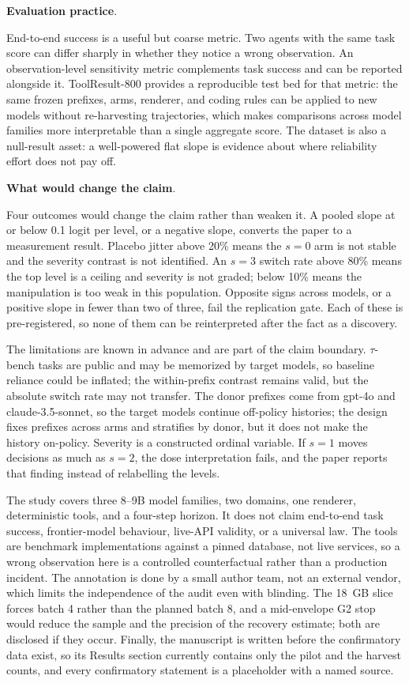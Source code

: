 \documentclass[a4paper,fleqn]{cas-sc}
\begin{document}
\noindent\textbf{Evaluation practice}.\

End-to-end success is a useful but coarse metric. Two agents with the same task score can differ
sharply in whether they notice a wrong observation. An observation-level sensitivity metric
complements task success and can be reported alongside it. ToolResult-800 provides a reproducible
test bed for that metric: the same frozen prefixes, arms, renderer, and coding rules can be
applied to new models without re-harvesting trajectories, which makes comparisons across model
families more interpretable than a single aggregate score. The dataset is also a null-result
asset: a well-powered flat slope is evidence about where reliability effort does not pay off.

\noindent\textbf{What would change the claim}.\

Four outcomes would change the claim rather than weaken it. A pooled slope at or below 0.1 logit
per level, or a negative slope, converts the paper to a measurement result. Placebo jitter above
20\% means the $s=0$ arm is not stable and the severity contrast is not identified. An $s=3$
switch rate above 80\% means the top level is a ceiling and severity is not graded; below 10\%
means the manipulation is too weak in this population. Opposite signs across models, or a
positive slope in fewer than two of three, fail the replication gate. Each of these is
pre-registered, so none of them can be reinterpreted after the fact as a discovery.



The limitations are known in advance and are part of the claim boundary. $\tau$-bench tasks are
public and may be memorized by target models, so baseline reliance could be inflated; the
within-prefix contrast remains valid, but the absolute switch rate may not transfer. The donor
prefixes come from gpt-4o and claude-3.5-sonnet, so the target models continue off-policy
histories; the design fixes prefixes across arms and stratifies by donor, but it does not make the
history on-policy. Severity is a constructed ordinal variable. If $s=1$ moves decisions as much as
$s=2$, the dose interpretation fails, and the paper reports that finding instead of relabelling
the levels.

The study covers three 8--9B model families, two domains, one renderer, deterministic tools, and a
four-step horizon. It does not claim end-to-end task success, frontier-model behaviour, live-API
validity, or a universal law. The tools are benchmark implementations against a pinned database,
not live services, so a wrong observation here is a controlled counterfactual rather than a
production incident. The annotation is done by a small author team, not an external vendor, which
limits the independence of the audit even with blinding. The 18~GB slice forces batch 4 rather
than the planned batch 8, and a mid-envelope G2 stop would reduce the sample and the precision of
the recovery estimate; both are disclosed if they occur. Finally, the manuscript is written
before the confirmatory data exist, so its Results section currently contains only the pilot and
the harvest counts, and every confirmatory statement is a placeholder with a named source.
\end{document}
